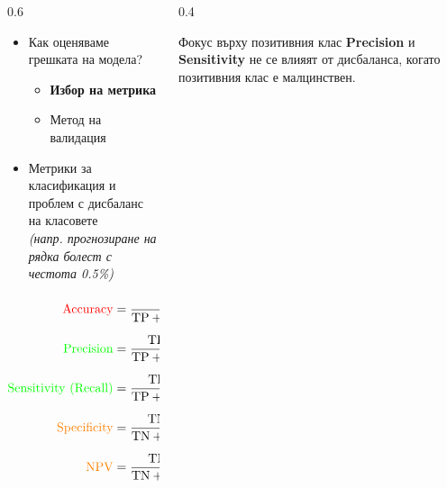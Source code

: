 \documentclass[8pt,t,aspectratio=169]{beamer}
\begin{document}

\begin{frame}
  \begin{columns}[T, onlytextwidth]
    \begin{column}{0.6\textwidth}
      \begin{itemize}
        \item Как оценяваме грешката на модела?
          \begin{itemize}
            \item \textbf{Избор на метрика}
            \item Метод на валидация
          \end{itemize}
            \vspace{0.1cm}
        \item Метрики за класификация и проблем с дисбаланс на класовете\\
        \vspace{0.5ex}
        {\small\itshape\color{gray} (напр. прогнозиране на рядка болест с честота 0.5\%)}
      \end{itemize}

      \hspace*{-1.65cm}
      \begin{minipage}{\linewidth}
        \small
        \begin{align*}
          {\color{red}\text{Accuracy}} &= \frac{\text{TP} + \text{TN}}{\text{TP} + \text{FP} + \text{TN} + \text{FN}} = 99.5\% \\[6pt]
          {\color{green}\text{Precision}} &= \frac{\text{TP}}{\text{TP} + \text{FP}} = 0\% \ (\text{undefined}) \\[6pt]
          {\color{green}\text{Sensitivity (Recall)}} &= \frac{\text{TP}}{\text{TP} + \text{FN}} = 0\% \\[6pt]
          {\color{orange}\text{Specificity}} &= \frac{\text{TN}}{\text{TN} + \text{FP}} = 100\%\\[6pt]
          {\color{orange}\text{NPV}} &= \frac{\text{TN}}{\text{TN} + \text{FN}} = 99.5\% 
        \end{align*}
      \end{minipage}
    \end{column}

    \begin{column}[T, onlytextwidth]{0.4\textwidth}
      \begin{block}{\small Фокус върху позитивния клас}
        \scriptsize
        \textbf{Precision} и \textbf{Sensitivity} не се влияят от дисбаланса, когато позитивния клас е малцинствен.
      \end{block}


\end{column}
\end{columns}
\end{frame}
\end{document}
